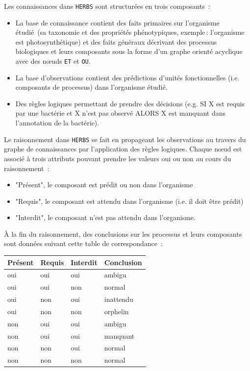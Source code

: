 \begin{refsegment}
Les connaissances dans \texttt{HERBS} sont structurées en trois composants :\nolisttopbreak
\begin{itemize}
    \item La base de connaissance contient des faits primaires sur l’organisme étudié (sa taxonomie  et des propriétés phénotypiques, exemple : l’organisme est photosynthétique) et des faits généraux décrivant des processus biologiques et leurs composants sous la forme d’un  graphe orienté acyclique avec des nœuds \texttt{ET} et \texttt{OU}.
    \item La base d’observations contient des prédictions d’unités fonctionnelles (i.e. composants de processus) dans l’organisme étudié.
    \item Des règles logiques permettant de prendre des décisions (e.g. SI X est requis par une bactérie et X n’est pas observé ALORS X est manquant dans l’annotation de la bactérie).
\end{itemize}

Le raisonnement dans \texttt{HERBS} se fait en propageant les observations au travers du graphe de connaissances par l’application des règles logiques. Chaque nœud est associé à trois attributs pouvant prendre les valeurs oui ou non au cours du raisonnement :\nolisttopbreak
\begin{itemize}
    \item "Présent", le composant est prédit ou non dans l’organisme
    \item "Requis", le composant est attendu dans l’organisme (i.e. il doit être prédit)
    \item "Interdit", le composant n’est pas attendu dans l’organisme.
\end{itemize}

À la fin du raisonnement, des conclusions sur les processus et leurs composants sont données suivant cette table de correspondance :\nolisttopbreak
\begin{table}[H]
    \centering
    \begin{tabular}{|l|l|l|>{\columncolor{LightCyan}}l|}
        \toprule
        \rowcolor{LightCyan}
        \textbf{Présent} & \textbf{Requis} & \textbf{Interdit} & \textbf{Conclusion} \\ 
        \midrule
        oui & oui & oui & ambigu \\ 
        \hline 
        oui & oui & non & normal \\ 
        \hline 
        oui & non & oui & inattendu \\ 
        \hline 
        oui & non & non & orphelin \\ 
        \hline 
        non & oui & oui & ambigu \\ 
        \hline 
        non & oui & oui & manquant \\ 
        \hline 
        non & non & oui & normal \\ 
        \hline 
        non & non & non & normal \\ 
        \bottomrule
    \end{tabular} 
\end{table}


\end{refsegment}

